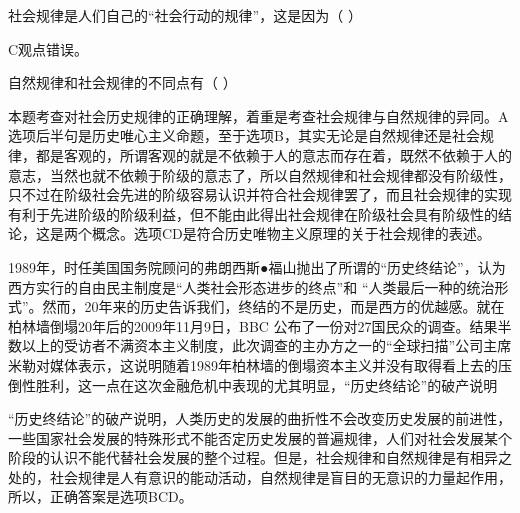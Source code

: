 \question 社会规律是人们自己的``社会行动的规律''，这是因为（ ）
\par{}
\begin{solution}C观点错误。
\end{solution}
\question 自然规律和社会规律的不同点有（ ）
\par{}
\begin{solution}本题考查对社会历史规律的正确理解，着重是考查社会规律与自然规律的异同。A选项后半句是历史唯心主义命题，至于选项B，其实无论是自然规律还是社会规律，都是客观的，所谓客观的就是不依赖于人的意志而存在着，既然不依赖于人的意志，当然也就不依赖于阶级的意志了，所以自然规律和社会规律都没有阶级性，只不过在阶级社会先进的阶级容易认识并符合社会规律罢了，而且社会规律的实现有利于先进阶级的阶级利益，但不能由此得出社会规律在阶级社会具有阶级性的结论，这是两个概念。选项CD是符合历史唯物主义原理的关于社会规律的表述。
\end{solution}
\question 1989年，时任美国国务院顾问的弗朗西斯●福山抛出了所谓的``历史终结论''，认为西方实行的自由民主制度是``人类社会形态进步的终点''和
``人类最后一种的统治形式''。然而，20年来的历史告诉我们，终结的不是历史，而是西方的优越感。就在柏林墙倒塌20年后的2009年11月9日，BBC
公布了一份对27国民众的调查。结果半数以上的受访者不满资本主义制度，此次调查的主办方之一的``全球扫描''公司主席米勒对媒体表示，这说明随着1989年柏林墙的倒塌资本主义并没有取得看上去的压倒性胜利，这一点在这次金融危机中表现的尤其明显，``历史终结论''的破产说明
\par{}
\begin{solution}``历史终结论''的破产说明，人类历史的发展的曲折性不会改变历史发展的前进性，一些国家社会发展的特殊形式不能否定历史发展的普遍规律，人们对社会发展某个阶段的认识不能代替社会发展的整个过程。但是，社会规律和自然规律是有相异之处的，社会规律是人有意识的能动活动，自然规律是盲目的无意识的力量起作用，所以，正确答案是选项BCD。
\end{solution}
